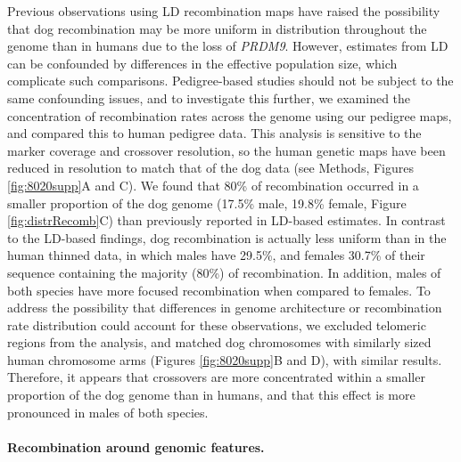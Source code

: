 Previous observations using LD recombination maps have raised the possibility that dog recombination may be more uniform in distribution throughout the genome than in humans due to the loss of \textit{PRDM9}\cite{Axelsson2012,Auton2013}.
However, estimates from LD can be confounded by differences in the effective population size, which complicate such comparisons.
Pedigree-based studies should not be subject to the same confounding issues, and
to investigate this further, we examined the concentration of recombination rates across the genome using our pedigree maps, and compared this to human pedigree data\cite{Campbell2015}.
This analysis is sensitive to the marker coverage and crossover resolution, so the human genetic maps have been reduced in resolution to match that of the dog data (see Methods, Figures \ref{fig:8020supp}A and C).
We found that 80\% of recombination occurred in a smaller proportion of the dog genome (17.5\% male, 19.8\% female, Figure \ref{fig:distrRecomb}C) than previously reported in LD-based estimates.
In contrast to the LD-based findings, dog recombination is actually less uniform than in the human thinned data,
in which males have 29.5\%, and females 30.7\% of their sequence containing the majority (80\%) of recombination.
In addition, males of both species have more focused recombination when compared to females.
To address the possibility that differences in genome architecture or recombination rate distribution could account for these observations, we excluded telomeric regions from the analysis, and matched dog chromosomes with similarly sized human chromosome arms (Figures \ref{fig:8020supp}B and D), with similar results.
Therefore, it appears that crossovers are more concentrated within a smaller proportion of the dog genome than in humans, and that this effect is more pronounced in males of both species.

\paragraph{Recombination around genomic features.}

